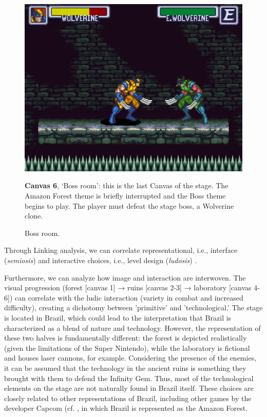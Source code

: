 \documentclass[english]{textolivre}
\begin{document}
\begin{figure}[htbp]
\begin{minipage}[t]{.47\textwidth}
\vspace{0pt}
\includegraphics[width=\textwidth]{fig-9.png}
\caption{Boss room.}
\label{fig-9}
\end{minipage}
\hfill
\begin{minipage}[t]{.47\textwidth}
\vspace{2pt}
\textbf{Canvas 6}, ‘Boss room’: this is the last Canvas of the stage. The Amazon Forest theme is briefly interrupted and the Boss theme begins to play. The player must defeat the stage boss, a Wolverine clone.
\end{minipage}
\end{figure}


Through Linking analysis, we can correlate representational, i.e., interface (\textit{semiosis}) and interactive choices, i.e., level design (\textit{ludosis}) \textcite[p. 27]{egenfeldt-nielsen_understanding_2016}.

Furthermore, we can analyze how image and interaction are interwoven. The visual progression (forest [canvas 1] → ruins [canvas 2-3] → laboratory [canvas 4-6]) can correlate with the ludic interaction (variety in combat and increased difficulty), creating a dichotomy between 'primitive' and 'technological.' The stage is located in Brazil, which could lead to the interpretation that Brazil is characterized as a blend of nature and technology. However, the representation of these two halves is fundamentally different: the forest is depicted realistically (given the limitations of the Super Nintendo), while the laboratory is fictional and houses laser cannons, for example. Considering the presence of the enemies, it can be assumed that the technology in the ancient ruins is something they brought with them to defend the Infinity Gem. Thus, most of the technological elements on the stage are not naturally found in Brazil itself. These choices are closely related to other representations of Brazil, including other games by the developer Capcom (cf. \textcite{capcom_street_1991}, in which Brazil is represented as the Amazon Forest.
\end{document}
